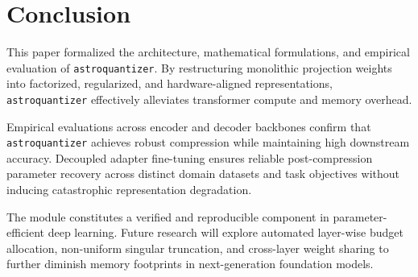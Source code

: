 \section{Conclusion}
This paper formalized the architecture, mathematical formulations, and empirical evaluation of \texttt{astroquantizer}. By restructuring monolithic projection weights into factorized, regularized, and hardware-aligned representations, \texttt{astroquantizer} effectively alleviates transformer compute and memory overhead.

Empirical evaluations across encoder and decoder backbones confirm that \texttt{astroquantizer} achieves robust compression while maintaining high downstream accuracy. Decoupled adapter fine-tuning ensures reliable post-compression parameter recovery across distinct domain datasets and task objectives without inducing catastrophic representation degradation.

The module constitutes a verified and reproducible component in parameter-efficient deep learning. Future research will explore automated layer-wise budget allocation, non-uniform singular truncation, and cross-layer weight sharing to further diminish memory footprints in next-generation foundation models.
